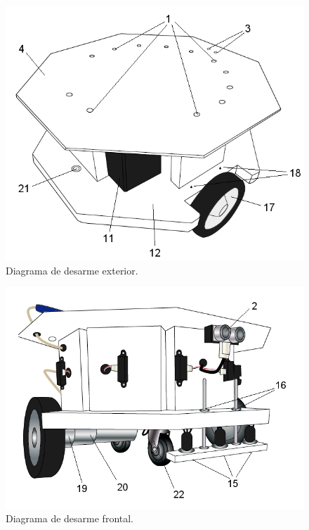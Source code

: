 \begin{figure}
	\centering
	\includegraphics[scale=.45]{figuras/desarme_e.png}
	\caption{Diagrama de desarme exterior.}
	\label{hF_desarme_1}
\end{figure}

\begin{figure}
	\centering
	\includegraphics[scale=.45]{figuras/desarme_f.png}
	\caption{Diagrama de desarme frontal.}
	\label{hF_desarme_2}
\end{figure}

